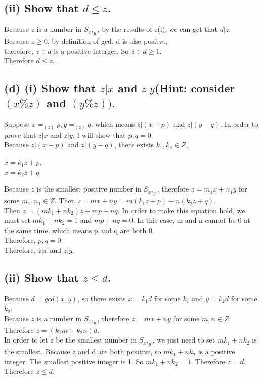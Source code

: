 \documentclass[]{article}
\begin{document}
\begin{spacing}{1.5}
\subsection*{(ii) Show that $ d  \leq z $. }
Because $ z $ is a number in $ S_{x},_{y} $, by the results of c(i), we can get that $ d | z $. \\
Because $ z \geq 0 $, by definition of gcd, d is also positve,\\ therefore, $ z \div d $ is a positive interger. So $ z \div d \geq 1 $.\\
Therefore $d \leq z$.

\subsection*{(d) (i) Show that $ z | x $ and  $z | y$(Hint: consider $(x \% z) $ and  $(y  \% z)). $}
Suppose $ x = _{(z)}p, y = _{(z)}q $, which means $ z|(x-p) $ and $  z|(y-q) $. In order to prove that $ z | x $ and  $z | y$,  I will show that $ p, q = 0 $.\\
Because $ z|(x-p) $ and $  z|(y-q) $, there exists $ k_1, k_2 \in Z$,
\begin{center}
	$ x = k_1z+p $,\\
	$ x = k_2z+q $.
\end{center}
Because $ z $ is the smallest positive number in $ S_{x},_{y} $, therefore $ z = m_1x+n_1y $ for some $ m_1,n_1 \in Z $. Then $ z = mx+ny = m(k_1z + p) + n(k_2z + q)$.\\
Then $ z = (mk_1 + nk_2)z + mp + nq $. In order to make this equation hold, we must set $ mk_1 + nk_2 = 1 $ and $ mp + nq  = 0 $. In this case, m and n cannot be 0 at the same time, which means p and q are both 0.\\
Therefore, $ p, q = 0 $.\\
Therefore, $ z | x $ and  $z | y$.

\subsection*{(ii) Show that $ z  \leq d $.}
Because $ d = gcd(x, y) $, so there exists $ x = k_1d $ for some $ k_1 $ and $ y = k_2d $ for some $ k_2 $.\\ 
Because $ z $ is a number in $ S_{x},_{y} $, therefore $ z = mx+ny $ for some $ m,n \in Z $. \\
Therefore $ z = (k_1m + k_2n)d $.\\
In order to let z be the smallest number in $ S_{x},_{y} $, we just need to set $ mk_1 + nk_2 $ is the smallest. Because z and d are both positive, so $ mk_1 + nk_2 $ is a positive integer. The smallest positive integer is 1. So $ mk_1 + nk_2 = 1$. Therefore $ z = d $.\\
Therefore $ z  \leq d $.


\end{spacing}
\end{document}
